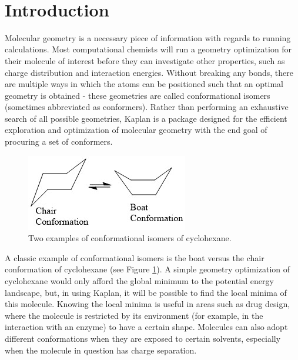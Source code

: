\documentclass[12pt]{article}
\newcommand{\progname}{Kaplan} %
\begin{document}
\newpage

\tableofcontents

~\newpage


\section{Introduction} \label{2intro}

Molecular geometry is a necessary piece of information with regards to running 
calculations. Most computational chemists will run a 
geometry optimization for 
their molecule of interest before they can investigate 
other properties, such as 
charge distribution and interaction energies. Without breaking any bonds, there 
are multiple ways in which the atoms can be positioned such that an optimal 
geometry is obtained - these geometries are called conformational isomers 
(sometimes abbreviated as conformers). Rather than 
performing an exhaustive 
search of all possible geometries, \progname{} is a 
package designed for the 
efficient exploration and optimization of molecular 
geometry with the end goal 
of procuring a set of conformers.


\begin{figure}[H]
	\begin{center}
	\includegraphics[]{C6H14}
	\end{center}
	\caption{Two examples of conformational isomers of cyclohexane.}
	\label{C6H14}
\end{figure}


A classic example of conformational isomers is the boat versus the chair 
conformation of cyclohexane (see Figure \ref{C6H14}). A simple geometry 
optimization of cyclohexane would only afford the 
global minimum to the 
potential energy landscape, but, in using \progname{}, it will be possible to 
find the local minima of this molecule.  Knowing the 
local minima is useful in 
areas such as drug design, where the molecule is restricted by its environment 
(for example, in the interaction with an enzyme) to have a certain shape. 
Molecules can also adopt different conformations when they are exposed to 
certain solvents, especially when the molecule in question has charge 
separation.
\end{document}
